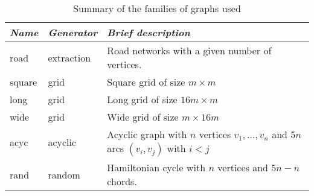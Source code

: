 \documentclass[11pt]{amsart}
\theoremstyle{plain}
\theoremstyle{remark}
\begin{document}
\begin{table}
\begin{center}
 	\begin{tabular}{|lll|}
 		\hline
 			\emph{Name} & \emph{Generator} & \emph{Brief description} \\
 		\hline
 			road & extraction	& Road networks with a given number of vertices. \\
 			\hline
 			square & grid & Square grid of size $m \times m$ \\
 			long & grid & Long grid of size $16m \times m$ \\
 			wide & grid & Wide grid of size $m \times 16 m$ \\
 			\hline
 			acyc & acyclic & Acyclic graph with $n$ vertices $v_{1},\ldots,v_{n}$ and $5n$ arcs $(v_{i},v_{j})$ with $i<j$ \\
\hline
 			rand & random &  			Hamiltonian cycle with $n$ vertices and $5n - n$ chords. \\
\hline
 	\end{tabular}
\end{center}
	\caption{Summary of the families of graphs used}
	\label{tab:FamilyGraphs}
 \end{table} 
\end{document}
